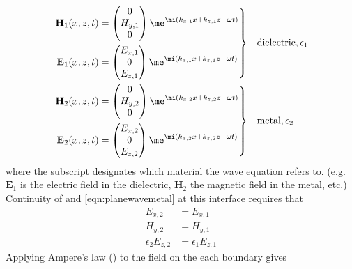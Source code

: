 \begin{align}
\left.\begin{aligned}
\mathbf{H}_1(x,z,t) &=
\begin{pmatrix}
0\\
H_{y,1}\\
0
\end{pmatrix} \me^{\mi(k_{x,1}x+k_{z,1}z-\omega t)}\\
\mathbf{E}_1(x,z,t) &=
\begin{pmatrix}
E_{x,1}\\
0\\
E_{z,1}\\
\end{pmatrix} \me^{\mi(k_{x,1}x+k_{z,1}z-\omega t)}
\end{aligned}
\right\}& \quad \text{dielectric}, \epsilon_1\label{eqn:planewavedielectric}\\
\left.\begin{aligned}
\mathbf{H}_2(x,z,t) &=
\begin{pmatrix}
0\\
H_{y,2}\\
0
\end{pmatrix}
\me^{\mi(k_{x,2}x+k_{z,2}z-\omega t)}\\
\mathbf{E}_2(x,z,t) &=
\begin{pmatrix}
E_{x,2}\\
0\\
E_{z,2}\\
\end{pmatrix}
\me^{\mi(k_{x,2}x+k_{z,2}z-\omega t)}
\end{aligned} 
\right\}&\quad \text{metal}, \epsilon_2
\label{eqn:planewavemetal}
\end{align}
where the subscript designates which material the wave equation refers to.
(e.g. $\mathbf{E}_1$ is the electric field in the dielectric, $\mathbf{H}_2$
the magnetic field in the metal, etc.)
Continuity of  and
\ref{eqn:planewavemetal} at this interface requires that
\begin{align}
E_{x,2}&=E_{x,1}\\
H_{y,2}&=H_{y,1}\\
\epsilon_2 E_{z,2}&=\epsilon_1 E_{z,1}
\end{align}
Applying Ampere's law () to the field on the
each boundary gives
